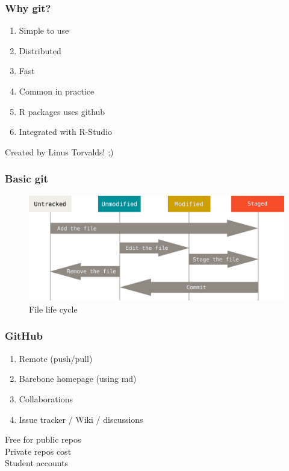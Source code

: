 \documentclass{beamer}
\begin{document}
\begin{frame}
	\frametitle{Why git?}
	\begin{center}
		\begin{enumerate}
			\item Simple to use
			\item Distributed
			\item Fast
			\item Common in practice
			\item R packages uses github
			\item Integrated with R-Studio
		\end{enumerate}
	\end{center}
	Created by Linus Torvalds! ;)
\end{frame}

\begin{frame}
	\frametitle{Basic git}
	\begin{center}
		\begin{figure}[!ht]
			\includegraphics[scale=0.20]{figures/git-lifecycle}
			\caption{File life cycle}
			\label{fig:pkgns}
		\end{figure}
	\end{center}
\end{frame}

\begin{frame}
	\frametitle{GitHub}
	\begin{enumerate}
		\item Remote (push/pull)
		\item Barebone homepage (using md)
		\item Collaborations
		\item Issue tracker / Wiki / discussions
	\end{enumerate}
	
	Free for public repos \\
	Private repos cost \\
	Student accounts \\
\end{frame}
\end{document}
